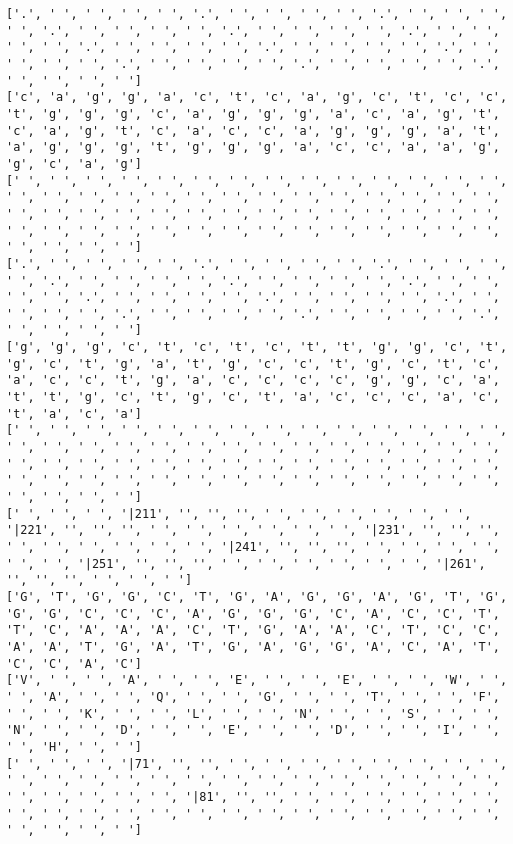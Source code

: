\documentclass{article}
\begin{document}
\begin{Verbatim}
['.', ' ', ' ', ' ', ' ', '.', ' ', ' ', ' ', ' ', '.', ' ', ' ', ' ', ' ', '.', ' ', ' ', ' ', ' ', '.', ' ', ' ', ' ', ' ', '.', ' ', ' ', ' ', ' ', '.', ' ', ' ', ' ', ' ', '.', ' ', ' ', ' ', ' ', '.', ' ', ' ', ' ', ' ', '.', ' ', ' ', ' ', ' ', '.', ' ', ' ', ' ', ' ', '.', ' ', ' ', ' ', ' ']
['c', 'a', 'g', 'g', 'a', 'c', 't', 'c', 'a', 'g', 'c', 't', 'c', 'c', 't', 'g', 'g', 'g', 'c', 'a', 'g', 'g', 'g', 'a', 'c', 'a', 'g', 't', 'c', 'a', 'g', 't', 'c', 'a', 'c', 'c', 'a', 'g', 'g', 'g', 'a', 't', 'a', 'g', 'g', 'g', 't', 'g', 'g', 'g', 'a', 'c', 'c', 'a', 'a', 'g', 'g', 'c', 'a', 'g']
[' ', ' ', ' ', ' ', ' ', ' ', ' ', ' ', ' ', ' ', ' ', ' ', ' ', ' ', ' ', ' ', ' ', ' ', ' ', ' ', ' ', ' ', ' ', ' ', ' ', ' ', ' ', ' ', ' ', ' ', ' ', ' ', ' ', ' ', ' ', ' ', ' ', ' ', ' ', ' ', ' ', ' ', ' ', ' ', ' ', ' ', ' ', ' ', ' ', ' ', ' ', ' ', ' ', ' ', ' ', ' ', ' ', ' ', ' ', ' ']
['.', ' ', ' ', ' ', ' ', '.', ' ', ' ', ' ', ' ', '.', ' ', ' ', ' ', ' ', '.', ' ', ' ', ' ', ' ', '.', ' ', ' ', ' ', ' ', '.', ' ', ' ', ' ', ' ', '.', ' ', ' ', ' ', ' ', '.', ' ', ' ', ' ', ' ', '.', ' ', ' ', ' ', ' ', '.', ' ', ' ', ' ', ' ', '.', ' ', ' ', ' ', ' ', '.', ' ', ' ', ' ', ' ']
['g', 'g', 'g', 'c', 't', 'c', 't', 'c', 't', 't', 'g', 'g', 'c', 't', 'g', 'c', 't', 'g', 'a', 't', 'g', 'c', 'c', 't', 'g', 'c', 't', 'c', 'a', 'c', 'c', 't', 'g', 'a', 'c', 'c', 'c', 'c', 'g', 'g', 'c', 'a', 't', 't', 'g', 'c', 't', 'g', 'c', 't', 'a', 'c', 'c', 'c', 'a', 'c', 't', 'a', 'c', 'a']
[' ', ' ', ' ', ' ', ' ', ' ', ' ', ' ', ' ', ' ', ' ', ' ', ' ', ' ', ' ', ' ', ' ', ' ', ' ', ' ', ' ', ' ', ' ', ' ', ' ', ' ', ' ', ' ', ' ', ' ', ' ', ' ', ' ', ' ', ' ', ' ', ' ', ' ', ' ', ' ', ' ', ' ', ' ', ' ', ' ', ' ', ' ', ' ', ' ', ' ', ' ', ' ', ' ', ' ', ' ', ' ', ' ', ' ', ' ', ' ']
[' ', ' ', ' ', '|211', '', '', '', ' ', ' ', ' ', ' ', ' ', ' ', '|221', '', '', '', ' ', ' ', ' ', ' ', ' ', ' ', '|231', '', '', '', ' ', ' ', ' ', ' ', ' ', ' ', '|241', '', '', '', ' ', ' ', ' ', ' ', ' ', ' ', '|251', '', '', '', ' ', ' ', ' ', ' ', ' ', ' ', '|261', '', '', '', ' ', ' ', ' ']
['G', 'T', 'G', 'G', 'C', 'T', 'G', 'A', 'G', 'G', 'A', 'G', 'T', 'G', 'G', 'G', 'C', 'C', 'C', 'A', 'G', 'G', 'G', 'C', 'A', 'C', 'C', 'T', 'T', 'C', 'A', 'A', 'A', 'C', 'T', 'G', 'A', 'A', 'C', 'T', 'C', 'C', 'A', 'A', 'T', 'G', 'A', 'T', 'G', 'A', 'G', 'G', 'A', 'C', 'A', 'T', 'C', 'C', 'A', 'C']
['V', ' ', ' ', 'A', ' ', ' ', 'E', ' ', ' ', 'E', ' ', ' ', 'W', ' ', ' ', 'A', ' ', ' ', 'Q', ' ', ' ', 'G', ' ', ' ', 'T', ' ', ' ', 'F', ' ', ' ', 'K', ' ', ' ', 'L', ' ', ' ', 'N', ' ', ' ', 'S', ' ', ' ', 'N', ' ', ' ', 'D', ' ', ' ', 'E', ' ', ' ', 'D', ' ', ' ', 'I', ' ', ' ', 'H', ' ', ' ']
[' ', ' ', ' ', '|71', '', '', ' ', ' ', ' ', ' ', ' ', ' ', ' ', ' ', ' ', ' ', ' ', ' ', ' ', ' ', ' ', ' ', ' ', ' ', ' ', ' ', ' ', ' ', ' ', ' ', ' ', ' ', ' ', '|81', '', '', ' ', ' ', ' ', ' ', ' ', ' ', ' ', ' ', ' ', ' ', ' ', ' ', ' ', ' ', ' ', ' ', ' ', ' ', ' ', ' ', ' ', ' ', ' ', ' ']
  

\end{Verbatim}
\end{document}
